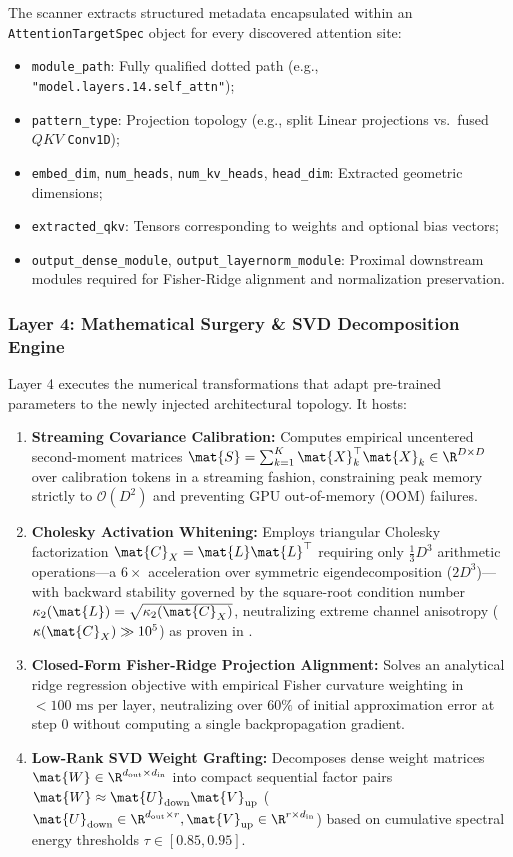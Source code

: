 The scanner extracts structured metadata encapsulated within an \texttt{AttentionTargetSpec} object for every discovered attention site:
\begin{itemize}
    \item \texttt{module\_path}: Fully qualified dotted path (e.g., \texttt{"model.layers.14.self\_attn"});
    \item \texttt{pattern\_type}: Projection topology (e.g., split Linear projections vs.\ fused $QKV$ \texttt{Conv1D});
    \item \texttt{embed\_dim}, \texttt{num\_heads}, \texttt{num\_kv\_heads}, \texttt{head\_dim}: Extracted geometric dimensions;
    \item \texttt{extracted\_qkv}: Tensors corresponding to weights and optional bias vectors;
    \item \texttt{output\_dense\_module}, \texttt{output\_layernorm\_module}: Proximal downstream modules required for Fisher-Ridge alignment and normalization preservation.
\end{itemize}

\subsubsection{Layer 4: Mathematical Surgery \& SVD Decomposition Engine}
Layer 4 executes the numerical transformations that adapt pre-trained parameters to the newly injected architectural topology. It hosts:
\begin{enumerate}
    \item \textbf{Streaming Covariance Calibration:} Computes empirical uncentered second-moment matrices $\mat{S} = \sum_{k=1}^K \mat{X}_k^\top \mat{X}_k \in \R^{D \times D}$ over calibration tokens in a streaming fashion, constraining peak memory strictly to $\mathcal{O}(D^2)$ and preventing GPU out-of-memory (OOM) failures.
    \item \textbf{Cholesky Activation Whitening:} Employs triangular Cholesky factorization $\mat{C}_X = \mat{L}\mat{L}^\top$ requiring only $\frac{1}{3} D^3$ arithmetic operations---a $6\times$ acceleration over symmetric eigendecomposition ($2 D^3$)---with backward stability governed by the square-root condition number $\kappa_2(\mat{L}) = \sqrt{\kappa_2(\mat{C}_X)}$, neutralizing extreme channel anisotropy ($\kappa(\mat{C}_X) \gg 10^5$) as proven in .
    \item \textbf{Closed-Form Fisher-Ridge Projection Alignment:} Solves an analytical ridge regression objective with empirical Fisher curvature weighting in $<100\text{ ms}$ per layer, neutralizing over $60\%$ of initial approximation error at step 0 without computing a single backpropagation gradient.
    \item \textbf{Low-Rank SVD Weight Grafting:} Decomposes dense weight matrices $\mat{W} \in \R^{d_{\text{out}} \times d_{\text{in}}}$ into compact sequential factor pairs $\mat{W} \approx \mat{U}_{\text{down}} \mat{V}_{\text{up}}$ ($\mat{U}_{\text{down}} \in \R^{d_{\text{out}} \times r}, \mat{V}_{\text{up}} \in \R^{r \times d_{\text{in}}}$) based on cumulative spectral energy thresholds $\tau \in [0.85, 0.95]$.
\end{enumerate}

